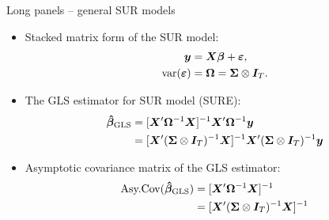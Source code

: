 \documentclass[usenames,dvipsnames]{beamer}
\begin{document}
\begin{frame}{Long panels -- general SUR models}
\small
\begin{itemize}
    \item Stacked matrix form of the SUR model:\\
    \begin{align*}
        \bm{y} &= \bm{X} \bm{\beta} + \bm{\varepsilon},\\
        \textnormal{var}(\bm{\varepsilon}) &= \bm{\Omega} = \bm{\Sigma} \otimes \bm{I}_T.
    \end{align*}
    \item The GLS estimator for SUR model (SURE):
    \begin{align*}
        \bm{\hat{\beta}}_{\textnormal{GLS}} &= [\bm{X}^{\prime} \bm{\Omega}^{-1} \bm{X}]^{-1} \bm{X}^{\prime} \bm{\Omega}^{-1} \bm{y} \\
        &= [\bm{X}^{\prime} (\bm{\Sigma} \otimes \bm{I}_T)^{-1} \bm{X}]^{-1} \bm{X}^{\prime} (\bm{\Sigma} \otimes \bm{I}_T)^{-1} \bm{y} 
    \end{align*}
    \item Asymptotic covariance matrix of the GLS estimator:
    \begin{align*}
        \textnormal{Asy.Cov}(\bm{\hat{\beta}}_{\textnormal{GLS}}) &= [\bm{X}^{\prime} \bm{\Omega}^{-1} \bm{X}]^{-1}\\
        &= [\bm{X}^{\prime} (\bm{\Sigma} \otimes \bm{I}_T)^{-1} \bm{X}]^{-1} 
    \end{align*}
\end{itemize}
\end{frame}
\end{document}
